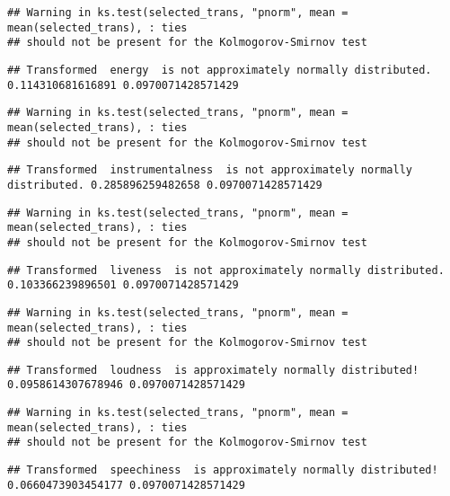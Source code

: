 \documentclass[
]{article}
\begin{document}
\begin{verbatim}
## Warning in ks.test(selected_trans, "pnorm", mean = mean(selected_trans), : ties
## should not be present for the Kolmogorov-Smirnov test
\end{verbatim}

\begin{verbatim}
## Transformed  energy  is not approximately normally distributed. 0.114310681616891 0.0970071428571429
\end{verbatim}

\begin{verbatim}
## Warning in ks.test(selected_trans, "pnorm", mean = mean(selected_trans), : ties
## should not be present for the Kolmogorov-Smirnov test
\end{verbatim}

\begin{verbatim}
## Transformed  instrumentalness  is not approximately normally distributed. 0.285896259482658 0.0970071428571429
\end{verbatim}

\begin{verbatim}
## Warning in ks.test(selected_trans, "pnorm", mean = mean(selected_trans), : ties
## should not be present for the Kolmogorov-Smirnov test
\end{verbatim}

\begin{verbatim}
## Transformed  liveness  is not approximately normally distributed. 0.103366239896501 0.0970071428571429
\end{verbatim}

\begin{verbatim}
## Warning in ks.test(selected_trans, "pnorm", mean = mean(selected_trans), : ties
## should not be present for the Kolmogorov-Smirnov test
\end{verbatim}

\begin{verbatim}
## Transformed  loudness  is approximately normally distributed! 0.0958614307678946 0.0970071428571429
\end{verbatim}

\begin{verbatim}
## Warning in ks.test(selected_trans, "pnorm", mean = mean(selected_trans), : ties
## should not be present for the Kolmogorov-Smirnov test
\end{verbatim}

\begin{verbatim}
## Transformed  speechiness  is approximately normally distributed! 0.0660473903454177 0.0970071428571429
\end{verbatim}
\end{document}
